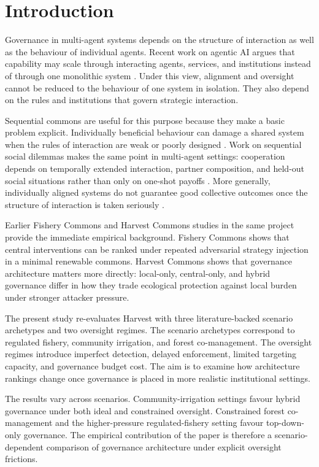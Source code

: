 \section{Introduction}

Governance in multi-agent systems depends on the structure of interaction as well as the behaviour of individual agents. Recent work on agentic AI argues that capability may scale through interacting agents, services, and institutions instead of through one monolithic system \citep{evans2025agentic}. Under this view, alignment and oversight cannot be reduced to the behaviour of one system in isolation. They also depend on the rules and institutions that govern strategic interaction.

Sequential commons are useful for this purpose because they make a basic problem explicit. Individually beneficial behaviour can damage a shared system when the rules of interaction are weak or poorly designed \citep{gordon1954common, scott1955fishery, ostrom1990}. Work on sequential social dilemmas makes the same point in multi-agent settings: cooperation depends on temporally extended interaction, partner composition, and held-out social situations rather than only on one-shot payoffs \citep{leibo2017multiagent, meltingpot2021, socialjax2025}. More generally, individually aligned systems do not guarantee good collective outcomes once the structure of interaction is taken seriously \citep{conitzer2023foundations}.

Earlier Fishery Commons and Harvest Commons studies in the same project provide the immediate empirical background. Fishery Commons shows that central interventions can be ranked under repeated adversarial strategy injection in a minimal renewable commons. Harvest Commons shows that governance architecture matters more directly: local-only, central-only, and hybrid governance differ in how they trade ecological protection against local burden under stronger attacker pressure.

The present study re-evaluates Harvest with three literature-backed scenario archetypes and two oversight regimes. The scenario archetypes correspond to regulated fishery, community irrigation, and forest co-management. The oversight regimes introduce imperfect detection, delayed enforcement, limited targeting capacity, and governance budget cost. The aim is to examine how architecture rankings change once governance is placed in more realistic institutional settings.

The results vary across scenarios. Community-irrigation settings favour hybrid governance under both ideal and constrained oversight. Constrained forest co-management and the higher-pressure regulated-fishery setting favour top-down-only governance. The empirical contribution of the paper is therefore a scenario-dependent comparison of governance architecture under explicit oversight frictions.
